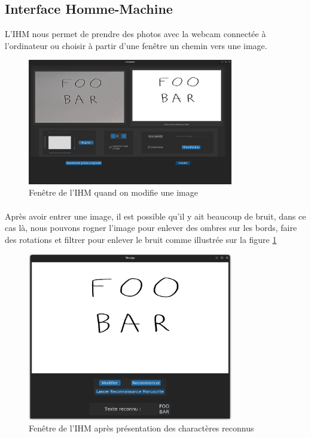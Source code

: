 \documentclass[a4paper]{article}
\begin{document}
		\subsection{Interface Homme-Machine}
			L'IHM nous permet de prendre des photos avec la webcam connectée à l'ordinateur ou choisir à partir d'une fenêtre un chemin vers une image. 
			\begin{figure}[H]
				\includegraphics[width=0.8\textwidth]{modif.png}
				\centering
				\caption{Fenêtre de l'IHM quand on modifie une image}
				\label{fig:modif}
			\end{figure}
			\paragraph{}
				Après avoir entrer une image, il est possible qu'il y ait beaucoup de bruit, dans ce cas là, nous pouvons rogner l'image pour enlever des ombres sur les bords, faire des rotations et filtrer pour enlever le bruit comme illustrée sur la figure \ref{fig:modif}
			\begin{figure}[H]
				\includegraphics[width=0.8\textwidth]{recon.png}
				\centering
				\caption{Fenêtre de l'IHM après présentation des charactères reconnus}
				\label{fig:recon}
			\end{figure}
\end{document}
